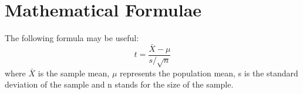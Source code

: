 \section{Mathematical Formulae}

The following formula may be useful:
$$ t = \frac{\bar{X} - \mu}{s / \sqrt{n}} $$
where $\bar{X}$ is the sample mean, $\mu$ represents the population mean, s is the standard deviation of the sample and n stands for the size of the sample.